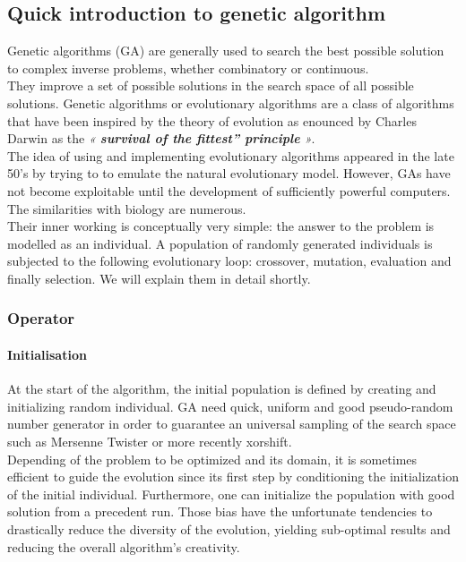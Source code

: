\documentclass[12pt]{memoir}
\begin{document}
\subsection{Quick introduction to genetic algorithm} %
\label{sub:Quick introduction to genetic algorithm}

Genetic algorithms (GA) are generally used to search the best possible solution to complex inverse problems, whether combinatory or continuous. \\
They improve  a set of possible solutions in the search space of all possible solutions. Genetic algorithms or evolutionary algorithms are a class of algorithms that have been inspired by the theory of evolution as enounced by Charles Darwin as the \emph{« \textbf{survival of the fittest” principle} »}. \\
The idea of using and implementing evolutionary algorithms appeared in the late 50’s\cite{john1992adaptation} by trying to to emulate the natural evolutionary model. However, GAs have not become exploitable until the development of sufficiently powerful computers. The similarities with biology are numerous. \\
Their inner working is conceptually very simple: the answer to the problem is modelled as an  individual. A population of randomly generated individuals is subjected to the following evolutionary loop: crossover, mutation, evaluation and finally selection. We will explain them in detail shortly.



\subsubsection{Operator} %
\label{sub:}
\paragraph{Initialisation} %
\label{par:Initialisation}
At the start of the algorithm,  the initial population is defined by creating and initializing random individual. GA  need quick, uniform and good pseudo-random number generator in order to guarantee an universal sampling of the search space such as Mersenne Twister or more recently xorshift. \\
Depending of the problem to be optimized and its domain, it is sometimes efficient to guide the evolution since its first step by conditioning the initialization of the initial individual. Furthermore, one can initialize the population with good solution from a precedent run. Those bias have the unfortunate tendencies to drastically reduce the diversity of the evolution, yielding sub-optimal results and reducing the overall algorithm’s creativity.
\end{document}
